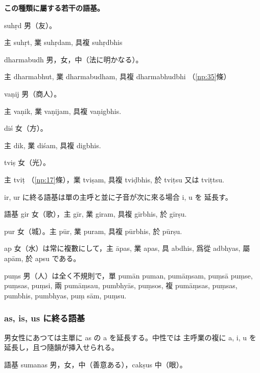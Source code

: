 \numberParagraph
\textbf{この種類に屬する若干の語基。}

suhṛd 男（友）。

主 suhṛt, 業 suhṛdam, 具複 suhṛdbhis

dharmabudh 男，女，中（法に明かなる）。

主 dharmabhut, 業 dharmabudham, 具複 dharmabhudbhi （\ref{np:35}條）

vaṇij 男（商人）。

主 vaṇik, 業 vaṇijam, 具複 vaṇigbhis.

diś 女（方）。

主 dik, 業 diśam, 具複 digbhis.

tviṣ 女（光）。

主 tviṭ （\ref{np:17}條），業 tviṣam, 具複 tviḍbhis, 於 tviṭsu 又は
tviṭtsu.

ir, ur に終る語基は單の主呼と並に子音が次に來る場合 i, u を
延長す。

語基 gir 女（歌），主 gīr, 業 giram, 具複 gīrbhis, 於 gīrṣu.

pur 女（城）。主 pūr, 業 puram, 具複 pūrbhis, 於 pūrṣu.

ap 女（水）は常に複數にして，主 āpas, 業 apas, 具 abdhis,
爲從 adbhyas, 屬 apām, 於 apsu である。

puṃs 男（人）は全く不規則で，單 pumān puman, pumāṃsam,
puṃsā puṃse, puṃsas, puṃsi, 兩 pumāṃsau, pumbhyās,
puṃsos, 複 pumāṃsas, puṃsas, pumbhis, pumbhyas, puṃ\-%
sām, puṃsu.

\subsubsection{as, is, us に終る語基}

\numberParagraph
男女性にあつては主單に as の a を延長する。中性では
主呼業の複に a, i, u を延長し，且つ隨韻が挿入せられる。

語基 sumanas 男，女，中（善意ある），cakṣus 中（眼）。

